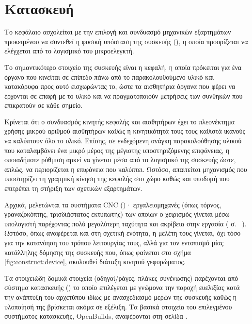 \chapter{Κατασκευή}
\label{ch:construction}

Το κεφάλαιο ασχολείται με την επιλογή και συνδυασμό μηχανικών εξαρτημάτων
προκειμένου να συντεθεί η φυσική υπόσταση της συσκευής (), η οποία
προορίζεται να ελέγχεται από το λογισμικό του μικροελεγκτή.

Το σημαντικότερο στοιχείο της συσκευής είναι η κεφαλή, η οποία πρόκειται για ένα
όργανο που κινείται σε επίπεδο πάνω από το παρακολουθούμενο υλικό και κατακόρυφα
προς αυτό εισχωρώντας το, ώστε τα αισθητήρια όργανα που φέρει να έρχονται σε
επαφή με το υλικό και να πραγματοποιούν μετρήσεις των συνθηκών που επικρατούν
σε κάθε σημείο.

Κρίνεται ότι ο συνδυασμός κινητής κεφαλής και αισθητήρων έχει το πλεονέκτημα
χρήσης μικρού αριθμού αισθητήρων καθώς η κινητικότητά τους τους καθιστά ικανούς
να καλύπτουν όλο το υλικό. Επίσης, σε ενδεχόμενη ανάγκη παρακολούθησης υλικού
που καταλαμβάνει ένα μικρό μέρος της μέγιστης υποστηριζόμενης επιφάνειας, η
οποιαδήποτε ρύθμιση αρκεί να γίνεται μέσα από το λογισμικό της συσκευής ώστε,
απλώς, να περιορίζεται η επιφάνεια που καλύπτει.
Ωστόσο, απαιτείται μηχανισμός που υποστηρίζει τη γραμμική κίνηση της κεφαλής στο
χώρο καθώς και υποδομή που επιτρέπει τη στήριξη των σχετικών εξαρτημάτων.

Αρχικά, μελετώνται τα συστήματα CNC ()·
εργαλειομηχανές (όπως τόρνος, γραναζοκόπτης, τρισδιάστατος εκτυπωτής) των οποίων
ο χειρισμός γίνεται μέσω υπολογιστή παρέχοντας πολύ μεγαλύτερη ταχύτητα και
ακρίβεια στην εργασία ( σ.~%
\pageref{sec:construct:cnc}). Ωστόσο, όπως αναφέρεται και στη σχετική ενότητα, η
μελέτη τους γίνεται, όχι τόσο για την κατανόηση του τρόπου λειτουργίας τους,
αλλά για τον εντοπισμό μίας κατάλληλης δόμησης της συσκευής που, όπως φαίνεται
στο σχήμα \ref{fig:construct:device}, ακολουθεί διάταξη κινητού γεφυρώματος.

Τα στοιχειώδη δομικά στοιχεία (οδηγοί\slash{}ράγες, πλάκες συνένωσης) παρέχονται
από σύστημα κατασκευής () το οποίο επιλέγεται με
γνώμονα την παροχή ευελιξίας κατά την ανάπτυξη του αρχετύπου ιδίως με
ανασχεδιασμό μερών της συσκευής καθώς η υλοποίησή της βρίσκεται ακόμα σε
εξέλιξη. Τα βασικά στοιχεία του επιλεγμένου συστήματος κατασκευής, Open\-Builds,
αναφέρονται στη σελίδα \pageref{sec:construct:framework}.


